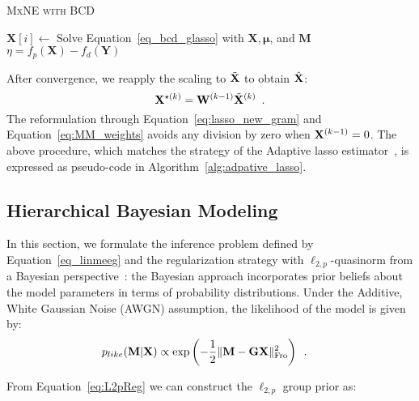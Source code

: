 {\fontsize{4}{4}\selectfont
\begin{algorithm}[t]
\caption{\textsc{MxNE with BCD}}
\While{
		$\eta \geq \epsilon$
	  }
	  {
	  		{
	  			$\mathbf{X}[i]\leftarrow$ Solve Equation~\eqref{eq_bcd_glasso} with $\mathbf{X}, \mathbf{\mu}$, and $\mathbf{M}$
	  		}
	  	$\eta = f_p(\mathbf{X})-f_d(\mathbf{Y})$
	  }
\label{alg:mxne_bcd}
\end{algorithm}
}

After convergence, we reapply the scaling to $\tilde{\mathbf{X}}$ to obtain $\hat{\mathbf{X}}$:
\begin{equation}
    \label{eq:MM_weights}
    \mathbf{X}^{\star(k)} = \mathbf{W}^{(k-1)} \tilde{\mathbf{X}}^{(k)} \enspace .
\end{equation}
The reformulation through Equation~\eqref{eq:lasso_new_gram} and Equation~\eqref{eq:MM_weights} avoids any division by zero when $\mathbf{X}^{(k-1)}=0$. The above procedure, which matches the strategy of the Adaptive \ac{lasso} estimator~\cite{Zou06}, is expressed as pseudo-code in Algorithm~\ref{alg:adpative_lasso}.

\subsection{Hierarchical Bayesian Modeling}
\label{section:HBM}

In this section, we formulate the inference problem defined by Equation~\eqref{eq_linmeeg} and the regularization strategy with $\ell_{2,p}$-quasinorm from a Bayesian perspective~\cite{KaSo05,Lu14}: the Bayesian approach incorporates prior beliefs about the model parameters in terms of probability distributions. Under the Additive, White Gaussian Noise (AWGN) assumption, the likelihood of the model is given by:
\begin{eqnarray} \label{eq:like}
p_{like}(\mathbf{M}|\mathbf{X}) &\propto \exp \left( - \frac{1}{2} \|{\mathbf{M} - \mathbf{G} \mathbf{X}}\|_{\rm Fro}^2 \right) \enspace.
\end{eqnarray}

From Equation~\eqref{eq:L2pReg} we can construct the $\ell_{2,p}$ group prior as:

